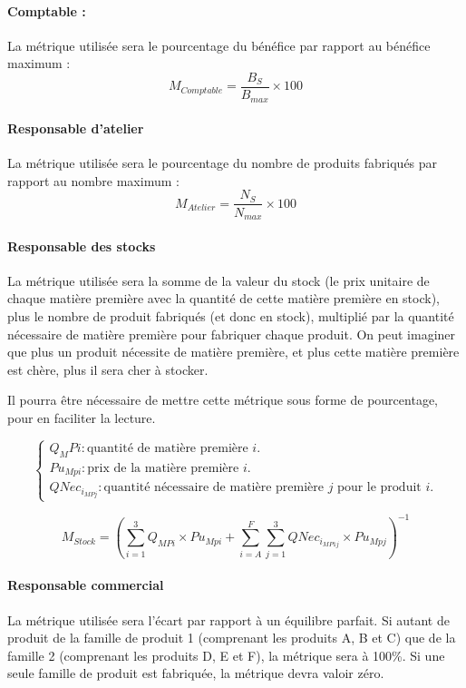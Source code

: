 \paragraph{Comptable :}
La métrique utilisée sera le pourcentage du bénéfice par rapport au bénéfice
maximum :
$$
M_{Comptable} = \frac{B_{S}}{B_{max}} \times 100
$$

\paragraph{Responsable d'atelier}
La métrique utilisée sera le pourcentage du nombre de produits fabriqués par
rapport au nombre maximum :
$$
M_{Atelier} = \frac{N_{S}}{N_{max}} \times 100
$$

\paragraph{Responsable des stocks}
La métrique utilisée sera la somme de la valeur du stock (le prix unitaire
de chaque matière première avec la quantité de cette matière
première en stock), plus le nombre de produit fabriqués (et donc en stock),
multiplié par la quantité nécessaire de matière première pour fabriquer chaque
produit. On peut imaginer que plus un produit nécessite de matière première, et
plus cette matière première est chère, plus il sera cher à stocker.

Il pourra être nécessaire de mettre cette métrique sous forme de pourcentage,
pour en faciliter la lecture.

$$
\begin{cases}
Q_MPi : \text{quantité de matière première } i.\\
Pu_{Mpi} : \text{prix de la matière première } i.\\
QNec_{i_{MPj}} : \text{quantité nécessaire de matière première $j$ pour le produit $i$.}
\end{cases}
$$

$$
M_{Stock} =  \left( 
	     \sum_{i=1}^{3} Q_{MPi} \times Pu_{Mpi} + 
	     \sum_{i=A}^{F} \sum_{j=1}^{3} QNec_{i_{MP1j}} \times Pu_{Mpj}
	     \right)^{-1}
$$

\paragraph{Responsable commercial}
La métrique utilisée sera l'écart par rapport à un équilibre parfait.
Si autant de produit de la famille de produit 1 (comprenant les produits A, B
et C) que de la famille 2 (comprenant les produits D, E et F), la métrique sera
à 100\%.
Si une seule famille de produit est fabriquée, la métrique devra valoir zéro.


